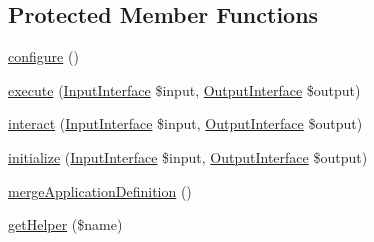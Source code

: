 \subsection*{Protected Member Functions}
\begin{DoxyCompactItemize}
\item 
\hyperlink{class_symfony_1_1_components_1_1_console_1_1_command_1_1_command_a9be5e0bdb5720efed6ddb6426c5c16ee}{configure} ()
\item 
\hyperlink{class_symfony_1_1_components_1_1_console_1_1_command_1_1_command_ab31c72b72ddaf7116db5d84c055d3c0b}{execute} (\hyperlink{interface_symfony_1_1_components_1_1_console_1_1_input_1_1_input_interface}{InputInterface} \$input, \hyperlink{interface_symfony_1_1_components_1_1_console_1_1_output_1_1_output_interface}{OutputInterface} \$output)
\item 
\hyperlink{class_symfony_1_1_components_1_1_console_1_1_command_1_1_command_a5b0d2db2d500d4b87b996412d89099d3}{interact} (\hyperlink{interface_symfony_1_1_components_1_1_console_1_1_input_1_1_input_interface}{InputInterface} \$input, \hyperlink{interface_symfony_1_1_components_1_1_console_1_1_output_1_1_output_interface}{OutputInterface} \$output)
\item 
\hyperlink{class_symfony_1_1_components_1_1_console_1_1_command_1_1_command_ae80be888d728ab1ac1618e14bb342820}{initialize} (\hyperlink{interface_symfony_1_1_components_1_1_console_1_1_input_1_1_input_interface}{InputInterface} \$input, \hyperlink{interface_symfony_1_1_components_1_1_console_1_1_output_1_1_output_interface}{OutputInterface} \$output)
\item 
\hyperlink{class_symfony_1_1_components_1_1_console_1_1_command_1_1_command_a91c24bd0a7be052079e5b61662a81eeb}{mergeApplicationDefinition} ()
\item 
\hyperlink{class_symfony_1_1_components_1_1_console_1_1_command_1_1_command_aac754e69de0422d173417a192292d134}{getHelper} (\$name)
\end{DoxyCompactItemize}

